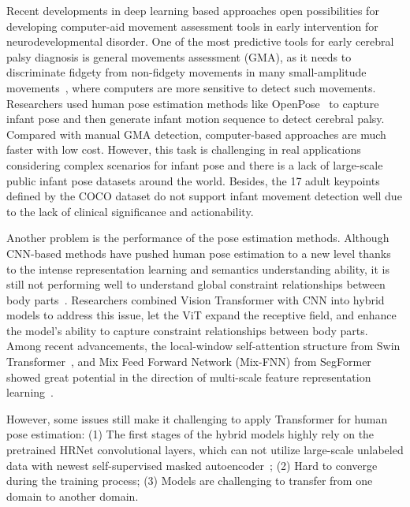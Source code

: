 \documentclass{article}
\begin{document}
Recent developments in deep learning based approaches open possibilities for developing computer-aid movement assessment tools in early intervention for neurodevelopmental disorder. One of the most predictive tools for early cerebral palsy diagnosis is general movements assessment (GMA), as it needs to discriminate fidgety from non-fidgety movements in many small-amplitude movements~\cite{silva2021future}, where computers are more sensitive to detect such movements. Researchers used human pose estimation methods like OpenPose~\cite{cao2019openpose} to capture infant pose and then generate infant motion sequence to detect cerebral palsy. Compared with manual GMA detection, computer-based approaches are much faster with low cost. However, this task is challenging in real applications considering complex scenarios for infant pose and there is a lack of large-scale public infant pose datasets around the world. Besides, the 17 adult keypoints defined by the COCO dataset do not support infant movement detection well due to the lack of clinical significance and actionability.

Another problem is the performance of the pose estimation methods. Although CNN-based methods have pushed human pose estimation to a new level thanks to the intense representation learning and semantics understanding ability, it is still not performing well to understand global constraint relationships between body parts~\cite{li2021tokenpose}. Researchers combined Vision Transformer with CNN into hybrid models to address this issue, let the ViT expand the receptive field, and enhance the model's ability to capture constraint relationships between body parts. Among recent advancements, the local-window self-attention structure from Swin Transformer~\cite{liu2021swin}, and Mix Feed Forward Network (Mix-FNN) from SegFormer~\cite{xie2021segformer} showed great potential in the direction of multi-scale feature representation learning~\cite{gu2021multi}.



However, some issues still make it challenging to apply Transformer for human pose estimation: (1) The first stages of the hybrid models highly rely on the pretrained HRNet convolutional layers, which can not utilize large-scale unlabeled data with newest self-supervised masked autoencoder~\cite{he2021masked}; (2) Hard to converge during the training process; (3) Models are challenging to transfer from one domain to another domain.
\end{document}
